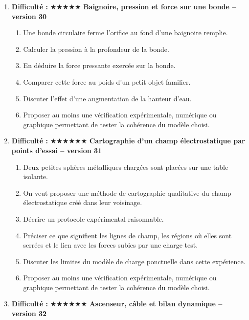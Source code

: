\documentclass[11pt,a4paper]{article}
\newcommand{\etoiles}[1]{\textbf{Difficulté : }#1}
\begin{document}
\begin{enumerate}[label=\textbf{Problème long \arabic*.},leftmargin=*]
\begin{enumerate}[label=\alph*)]
\item Relier cette variation à la somme des forces.
\item Discuter pourquoi ce cas contredit l'idée naïve ``vitesse constante donc pas de force''.
\item Proposer au moins une vérification expérimentale, numérique ou graphique permettant de tester la cohérence du modèle choisi.
\end{enumerate}
\item \etoiles{★★★★★}
\textbf{Baignoire, pression et force sur une bonde -- version 30}
\begin{enumerate}[label=\alph*)]
\item Une bonde circulaire ferme l'orifice au fond d'une baignoire remplie.
\item Calculer la pression à la profondeur de la bonde.
\item En déduire la force pressante exercée sur la bonde.
\item Comparer cette force au poids d'un petit objet familier.
\item Discuter l'effet d'une augmentation de la hauteur d'eau.
\item Proposer au moins une vérification expérimentale, numérique ou graphique permettant de tester la cohérence du modèle choisi.
\end{enumerate}
\item \etoiles{★★★★★★}
\textbf{Cartographie d'un champ électrostatique par points d'essai -- version 31}
\begin{enumerate}[label=\alph*)]
\item Deux petites sphères métalliques chargées sont placées sur une table isolante.
\item On veut proposer une méthode de cartographie qualitative du champ électrostatique créé dans leur voisinage.
\item Décrire un protocole expérimental raisonnable.
\item Préciser ce que signifient les lignes de champ, les régions où elles sont serrées et le lien avec les forces subies par une charge test.
\item Discuter les limites du modèle de charge ponctuelle dans cette expérience.
\item Proposer au moins une vérification expérimentale, numérique ou graphique permettant de tester la cohérence du modèle choisi.
\end{enumerate}
\item \etoiles{★★★★★★}
\textbf{Ascenseur, câble et bilan dynamique -- version 32}

\end{enumerate}
\end{document}
